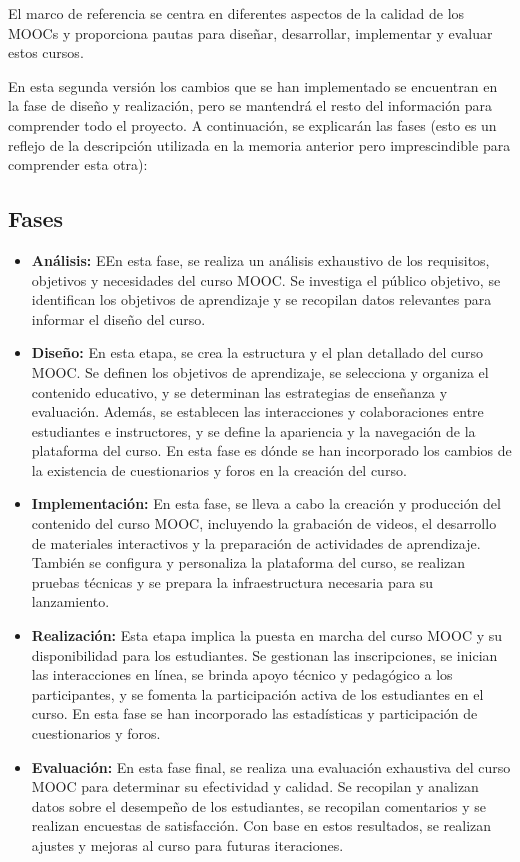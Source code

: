 El marco de referencia se centra en diferentes aspectos de la calidad de los MOOCs y proporciona pautas para diseñar, desarrollar, implementar y evaluar estos cursos.

En esta segunda versión los cambios que se han implementado se encuentran en la fase de diseño y realización, pero se mantendrá el resto del información para comprender todo el proyecto. A continuación, se explicarán las fases (esto es un reflejo de la descripción utilizada en la memoria anterior pero imprescindible para comprender esta otra):

\subsection{Fases}
\begin{itemize}
	\item \textbf{Análisis:}
	EEn esta fase, se realiza un análisis exhaustivo de los requisitos, objetivos y necesidades del curso MOOC. Se investiga el público objetivo, se identifican los objetivos de aprendizaje y se recopilan datos relevantes para informar el diseño del curso.
	\item \textbf{Diseño:}
	En esta etapa, se crea la estructura y el plan detallado del curso MOOC. Se definen los objetivos de aprendizaje, se selecciona y organiza el contenido educativo, y se determinan las estrategias de enseñanza y evaluación. Además, se establecen las interacciones y colaboraciones entre estudiantes e instructores, y se define la apariencia y la navegación de la plataforma del curso. En esta fase es dónde se han incorporado los cambios de la existencia de cuestionarios y foros en la creación del curso.
	\item \textbf{Implementación:}
	En esta fase, se lleva a cabo la creación y producción del contenido del curso MOOC, incluyendo la grabación de videos, el desarrollo de materiales interactivos y la preparación de actividades de aprendizaje. También se configura y personaliza la plataforma del curso, se realizan pruebas técnicas y se prepara la infraestructura necesaria para su lanzamiento.
	\item \textbf{Realización:}
	Esta etapa implica la puesta en marcha del curso MOOC y su disponibilidad para los estudiantes. Se gestionan las inscripciones, se inician las interacciones en línea, se brinda apoyo técnico y pedagógico a los participantes, y se fomenta la participación activa de los estudiantes en el curso. En esta fase se han incorporado las estadísticas y participación de cuestionarios y foros.
	\item \textbf{Evaluación:}
	En esta fase final, se realiza una evaluación exhaustiva del curso MOOC para determinar su efectividad y calidad. Se recopilan y analizan datos sobre el desempeño de los estudiantes, se recopilan comentarios y se realizan encuestas de satisfacción. Con base en estos resultados, se realizan ajustes y mejoras al curso para futuras iteraciones.
\end{itemize}

